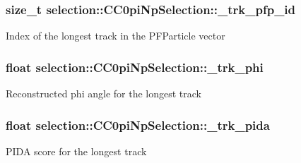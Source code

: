 \subsubsection[{\texorpdfstring{\+\_\+trk\+\_\+pfp\+\_\+id}{_trk_pfp_id}}]{\setlength{\rightskip}{0pt plus 5cm}size\+\_\+t selection\+::\+C\+C0pi\+Np\+Selection\+::\+\_\+trk\+\_\+pfp\+\_\+id\hspace{0.3cm}{\ttfamily [private]}}\hypertarget{classselection_1_1CC0piNpSelection_a641e7e656a28a5b31a5c8ab21dad9d3b}{}\label{classselection_1_1CC0piNpSelection_a641e7e656a28a5b31a5c8ab21dad9d3b}
Index of the longest track in the P\+F\+Particle vector 
\subsubsection[{\texorpdfstring{\+\_\+trk\+\_\+phi}{_trk_phi}}]{\setlength{\rightskip}{0pt plus 5cm}float selection\+::\+C\+C0pi\+Np\+Selection\+::\+\_\+trk\+\_\+phi\hspace{0.3cm}{\ttfamily [private]}}\hypertarget{classselection_1_1CC0piNpSelection_a85a6029e249e3ff20ea6d8eaabf22142}{}\label{classselection_1_1CC0piNpSelection_a85a6029e249e3ff20ea6d8eaabf22142}
Reconstructed phi angle for the longest track 
\subsubsection[{\texorpdfstring{\+\_\+trk\+\_\+pida}{_trk_pida}}]{\setlength{\rightskip}{0pt plus 5cm}float selection\+::\+C\+C0pi\+Np\+Selection\+::\+\_\+trk\+\_\+pida\hspace{0.3cm}{\ttfamily [private]}}\hypertarget{classselection_1_1CC0piNpSelection_af0fe49227e33b3f46015a821de58ba1f}{}\label{classselection_1_1CC0piNpSelection_af0fe49227e33b3f46015a821de58ba1f}
P\+I\+DA score for the longest track 
